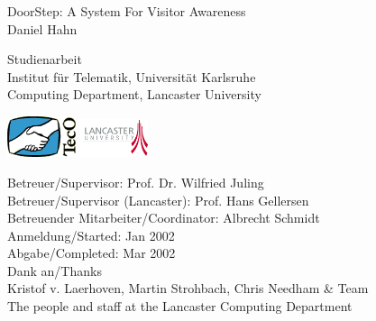 \documentclass[a4paper,twoside]{danarticle}
\theoremstyle{remark}
\begin{document}
  \begin{titlepage}
    \raggedleft
    \vspace{2cm}
    \sffamily
    {\huge
    DoorStep: A System For Visitor Awareness\\
    }
    {\large
    Daniel Hahn\\
    }
    \vspace{2cm}
    \raggedright
    {\Large
    \hspace{2cm}Studienarbeit\\
    }
    {\large
    \hspace{2cm}Institut f\"ur Telematik, Universit\"at Karlsruhe\\
    \hspace{2cm}Computing Department, Lancaster University\\
    }
    \vspace{1cm}
    \begin{center}
      \includegraphics[width=2cm]{tecologo}
      \hspace{1cm}
      \includegraphics[width=2cm]{lancslogo}
    \end{center}
    \vspace{5cm}
    {\normalsize
    \hspace{2cm}Betreuer/Supervisor: Prof. Dr. Wilfried Juling \\
    \hspace{2cm}Betreuer/Supervisor (Lancaster): Prof. Hans Gellersen \\
    \vspace{5mm}
    \hspace{2cm}Betreuender Mitarbeiter/Coordinator: Albrecht Schmidt \\
    }
    \vspace{2cm}
    {\normalsize
    \hspace{2cm}Anmeldung/Started: Jan 2002 \\
    \hspace{2cm}Abgabe/Completed: Mar 2002 \\
    }
    \vspace{4cm}
    \centering
    {\small 
    Dank an/Thanks \\
    Kristof v. Laerhoven, Martin Strohbach, Chris Needham \& Team \\
    The people and staff at the Lancaster Computing Department \\
    }
  \end{titlepage}
\end{document}
